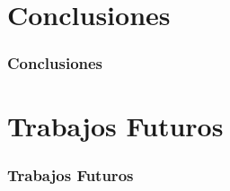 \documentclass{beamer}
\begin{document}
\section{Conclusiones}

\begin{frame}
\frametitle{Conclusiones}
\end{frame}





\section{Trabajos Futuros}
\begin{frame}
\frametitle{Trabajos Futuros}
\end{frame}


\end{document}
